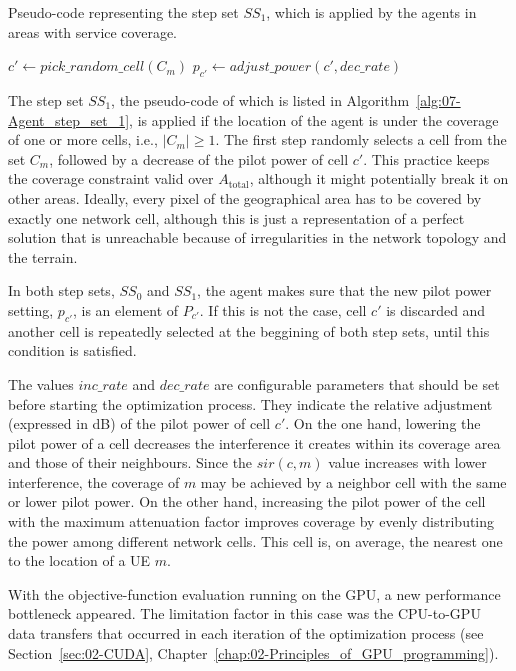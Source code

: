\begin{algorithm}
\centering

\caption{Pseudo-code representing the step set $SS_{1}$, which is applied
by the agents in areas with service coverage.\label{alg:07-Agent_step_set_1}}


\begin{algorithmic}
\Repeat
	\State $c'\gets pick\_random\_cell(C_{m})$
	\State $p_{c'}\gets adjust\_power(c',dec\_rate)$
\end{algorithmic}
\end{algorithm}


The step set $SS_{1}$, the pseudo-code of which is listed in Algorithm~\ref{alg:07-Agent_step_set_1},
is applied if the location of the agent is under the coverage of one
or more cells, i.e., $\vert C_{m}\vert\ge1$. The first step randomly
selects a cell from the set $C_{m}$, followed by a decrease of the
pilot power of cell $c'$. This practice keeps the coverage constraint
valid over $A_{\mathrm{total}}$, although it might potentially break
it on other areas. Ideally, every pixel of the geographical area has
to be covered by exactly one network cell, although this is just a
representation of a perfect solution that is unreachable because of
irregularities in the network topology and the terrain.

In both step sets, $SS_{0}$ and $SS_{1}$, the agent makes sure that
the new pilot power setting, $p_{c'}$, is an element of $P_{c'}$.
If this is not the case, cell $c'$ is discarded and another cell
is repeatedly selected at the beggining of both step sets, until this
condition is satisfied.

The values $inc\_rate$ and $dec\_rate$ are configurable parameters
that should be set before starting the optimization process. They
indicate the relative adjustment (expressed in dB) of the pilot power
of cell $c'$. On the one hand, lowering the pilot power of a cell
decreases the interference it creates within its coverage area and
those of their neighbours. Since the $sir(c,m)$ value increases with
lower interference, the coverage of $m$ may be achieved by a neighbor
cell with the same or lower pilot power. On the other hand, increasing
the pilot power of the cell with the maximum attenuation factor improves
coverage by evenly distributing the power among different network
cells. This cell is, on average, the nearest one to the location of
a UE $m$.

\bigskip{}


With the objective-function evaluation running on the GPU, a new performance
bottleneck appeared. The limitation factor in this case was the CPU-to-GPU
data transfers that occurred in each iteration of the optimization
process (see Section~\ref{sec:02-CUDA}, Chapter~\ref{chap:02-Principles_of_GPU_programming}).

